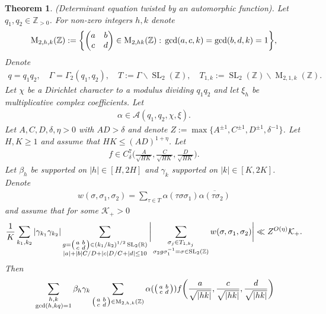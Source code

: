 \documentclass[12pt]{amsart}
\newtheorem{theorem}{Theorem}[section]
\theoremstyle{definition}
\theoremstyle{remark}
\numberwithin{equation}{section}
\newcommand{\R}{{\mathbb R}}
\newcommand{\Z}{{\mathbb Z}}
\newcommand{\1}{{\mathbf 1}}
\newcommand{\SL}{\operatorname{SL}_2}
\newcommand{\MM}{\operatorname{M}}
\begin{document}
\begin{theorem} \emph{(Determinant equation twisted by an automorphic function).} \label{thm:twisteddetwbound}
    Let $q_1,q_2 \in \Z_{> 0}$. For non-zero integers $h,k$ denote
\begin{align*}
    \MM_{2,h,k}(\Z) := \bigg\{ \mqty(a &b \\ c &d) \in \MM_{2,hk}(\Z): \,\gcd (a,c,k)=\gcd(b,d,k)=1 \bigg\},
\end{align*}
Denote
 \begin{align*}
    q=q_1q_2, \quad \Gamma = \Gamma_2(q_1,q_2), \quad T := \Gamma \backslash \SL(\Z), \quad T_{1,k}:= \SL(\Z) \backslash \MM_{2,1,k}(\Z).
 \end{align*}   
Let $\chi$ be a Dirichlet character to a modulus dividing $q_1q_2$ and let $\xi_h$ be multiplicative complex coefficients. Let
\begin{align*}
    \alpha \in   \mathcal{A}(q_1,q_2,\chi,\xi).
\end{align*}
 Let $A,C,D,\delta,\eta >0$ with $AD > \delta$  and denote $Z := \max\{A^{\pm 1},C^{\pm 1},D^{\pm 1}, \delta^{-1}\}$. Let $H,K \geq  1$  and assume that $HK \leq (AD)^{1+\eta}$. Let 
 \begin{align*}
   f\in C^{7}_\delta \bigg( \frac{A}{\sqrt{HK}},\frac{C}{\sqrt{HK}},\frac{D}{\sqrt{HK}}\bigg).
 \end{align*} 
Let $\beta_h$ be supported on $|h| \in [H,2H]$ and $\gamma_k$ supported on $|k| \in [K,2K]$. Denote
 \begin{align}\label{eq:wdef}
       w(\sigma,\sigma_1,\sigma_2) =  \sum_{\tau \in T} \alpha(\tau \sigma \sigma_1)  \overline{\alpha(\tau \sigma_2)} 
   \end{align}
and assume that for some $\mathcal{K}_+ >0$ 
\begin{align} \label{eq:Kassumptiongeneral}
    \frac{1}{K} \sum_{k_1,k_2} |\gamma_{k_1} \gamma_{k_2}| \sum_{\substack{g=\smqty(a&b \\ c & d)  \in (k_1/k_2)^{1/2} \SL(\R) \\ |a| + |b|C/D + |c|D/C + |d| \leq 10}} \bigg| \sum_{\substack{\sigma_j \in T_{1,k_j} \\ \sigma_2 g \sigma_1^{-1} =\sigma\in \SL(\Z) }}  w(\sigma,\sigma_1,\sigma_2) \bigg| \ll Z^{O(\eta)} \mathcal{K}_+.
\end{align}
Then
\begin{align*}
   &\sum_{\substack{h,k \\ \gcd(h,kq)=1}} \beta_h \gamma_k \sum_{\substack{\smqty(a& b \\ c& d)\in \MM_{2,h,k}(\Z)}}  \alpha(\smqty(a & b \\ c & d)) f\bigg(\frac{a}{ \sqrt{|hk|}},\frac{c}{ \sqrt{|hk|}},\frac{d}{ \sqrt{|hk|}}\bigg) \\

\end{align*}
\end{theorem}
\end{document}
